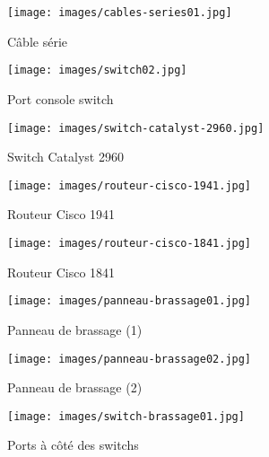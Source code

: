 \documentclass[a4paper]{article}
\begin{document}
\begin{itemize}
\begin{enumerate}
\end{enumerate}





\end{itemize}





\begin{figure}[H]
    \centering
    \texttt{[image: images/cables-series01.jpg]}
    \caption{Câble série}
    \label{fig:cableSerie01}
\end{figure}

\begin{figure}[H]
    \centering
    \texttt{[image: images/switch02.jpg]}
    \caption{Port console switch}
    \label{fig:portConsoleSwitch}
\end{figure}

\begin{figure}[H]
    \centering
    \texttt{[image: images/switch-catalyst-2960.jpg]}
    \caption{Switch Catalyst 2960}
    \label{fig:switchCatalyst2960}
\end{figure}

\begin{figure}[H]
    \centering
    \texttt{[image: images/routeur-cisco-1941.jpg]}
    \caption{Routeur Cisco 1941}
    \label{fig:routeurCisco1941}
\end{figure}

\begin{figure}[H]
    \centering
    \texttt{[image: images/routeur-cisco-1841.jpg]}
    \caption{Routeur Cisco 1841}
    \label{fig:routeurCisco1841}
\end{figure}

\begin{figure}[H]
    \centering
    \texttt{[image: images/panneau-brassage01.jpg]}
    \caption{Panneau de brassage (1)}
    \label{fig:panneauBrassage01}
\end{figure}

\begin{figure}[H]
    \centering
    \texttt{[image: images/panneau-brassage02.jpg]}
    \caption{Panneau de brassage (2)}
    \label{fig:panneauBrassage02}
\end{figure}

\begin{figure}[H]
    \centering
    \texttt{[image: images/switch-brassage01.jpg]}
    \caption{Ports à côté des switchs}
    \label{fig:switchBrassage01}
\end{figure}
\end{document}
